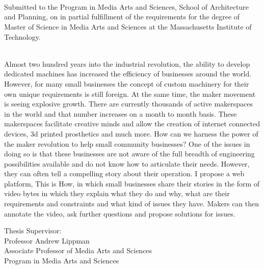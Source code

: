 \begin{titlepage}
      {\setlength{\parindent}{0cm}
        \large  


        \hfill


        \begingroup

            \color{Maroon}\spacedallcaps{\myTitle} \\ 
            \mySubtitle \\ 

            \bigskip
        \endgroup

        \spacedlowsmallcaps{\myName}\\ \medskip

   Submitted to the Program in Media Arts and Sciences, School of Architecture and Planning, on \myTime in partial fulfillment of the requirements for the degree of Master of Science in Media Arts and Sciences at the Massachusetts Institute of Technology. \\ 

\bigskip
{}\\ \medskip

Almost two hundred years into the industrial revolution, the ability to develop dedicated
machines has increased the efficiency of businesses around the world. However, for many small businesses the concept of custom machinery for their own unique requirements is still foreign. At the same time, the maker movement is seeing explosive growth. There are currently thousands of active makerspaces in the world and that number increases on a month to month basis. These makerspaces facilitate creative minds and allow the creation of internet connected devices, 3d printed prosthetics and much more. How can we harness the power of the maker revolution to help small community businesses? One of the issues in doing so is that these businesses are not aware of the full breadth of engineering possibilities available and do not know how to articulate their needs. However, they can often tell a compelling story about their operation. I propose a web platform, This is How, in which small businesses share their stories in the form of video bytes in which they explain what they do and why, what are their requirements and constraints and what kind of issues they have. Makers can then annotate the video, ask further questions and propose solutions for issues.
\vfill

Thesis Supervisor:\\
Professor Andrew Lippman\\
Associate Professor of Media Arts and Sciences\\
Program in Media Arts and Sciences

        }
\end{titlepage}   
